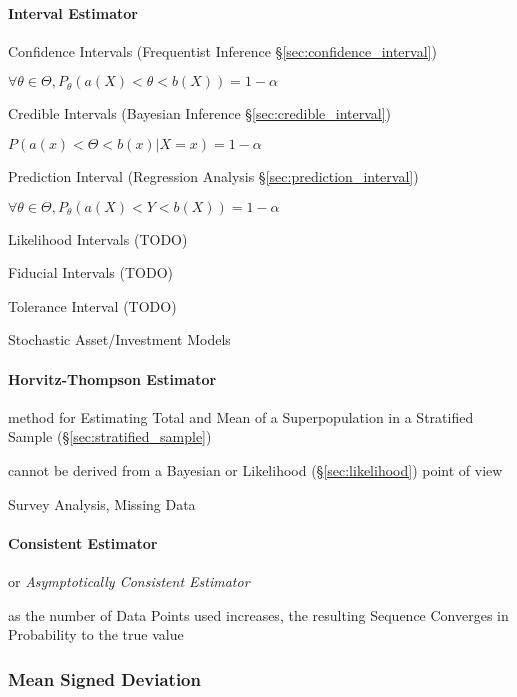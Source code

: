 \paragraph{Interval Estimator}\label{sec:interval_estimator}\hfill

Confidence Intervals (Frequentist Inference \S\ref{sec:confidence_interval})

$\forall \theta \in \Theta, P_\theta(a(X) < \theta < b(X)) = 1 - \alpha$

Credible Intervals (Bayesian Inference \S\ref{sec:credible_interval})

$P(a(x) < \Theta < b(x) | X = x) = 1 - \alpha$

Prediction Interval (Regression Analysis \S\ref{sec:prediction_interval})

$\forall \theta \in \Theta, P_\theta(a(X) < Y < b(X)) = 1 - \alpha$

Likelihood Intervals (TODO)

Fiducial Intervals (TODO)

Tolerance Interval (TODO)

Stochastic Asset/Investment Models



\paragraph{Horvitz-Thompson Estimator}\label{sec:horvitz_thompson}\hfill

method for Estimating Total and Mean of a Superpopulation in a Stratified Sample
(\S\ref{sec:stratified_sample})

cannot be derived from a Bayesian or Likelihood (\S\ref{sec:likelihood}) point
of view

Survey Analysis, Missing Data



\paragraph{Consistent Estimator}\label{sec:consistent_estimator}\hfill

or \emph{Asymptotically Consistent Estimator}

as the number of Data Points used increases, the resulting Sequence Converges in
Probability to the true value



\subsubsection{Mean Signed Deviation}\label{sec:mean_signed_deviation}

